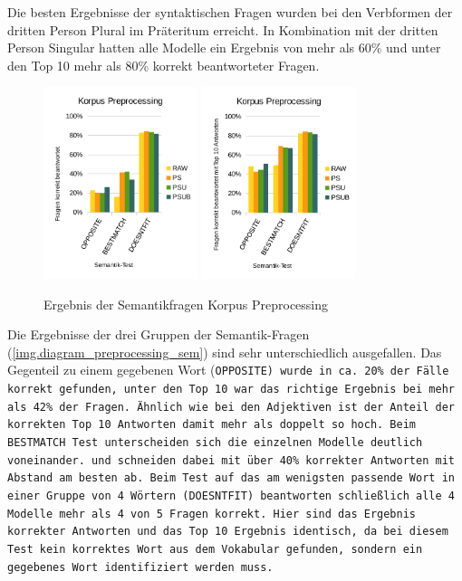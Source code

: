 Die besten Ergebnisse der syntaktischen Fragen wurden bei den Verbformen der dritten Person Plural im Präteritum erreicht. In Kombination mit der dritten Person Singular hatten alle Modelle ein Ergebnis von mehr als 60\% und unter den Top 10 mehr als 80\% korrekt beantworteter Fragen.

\begin{figure}[!ht]
\centering
{}
{\includegraphics[width=0.4\textwidth]{images/diagram_preprocessing_correct_sem}}
{\includegraphics[width=0.4\textwidth]{images/diagram_preprocessing_top10_sem}}
\caption[Ergebnis der Semantikfragen Korpus Preprocessing]{Ergebnis der Semantikfragen Korpus Preprocessing}\label{img.diagram_preprocessing_sem}
\end{figure}

Die Ergebnisse der drei Gruppen der Semantik-Fragen (\autoref{img.diagram_preprocessing_sem}) sind sehr unterschiedlich ausgefallen. Das Gegenteil zu einem gegebenen Wort (\tt{OPPOSITE}) wurde in ca. 20\% der Fälle korrekt gefunden, unter den Top 10 war das richtige Ergebnis bei mehr als 42\% der Fragen. Ähnlich wie bei den Adjektiven ist der Anteil der korrekten Top 10 Antworten damit mehr als doppelt so hoch.
Beim \tt{BESTMATCH} Test unterscheiden sich die einzelnen Modelle deutlich voneinander.  und  schneiden dabei mit über 40\% korrekter Antworten mit Abstand am besten ab.
Beim Test auf das am wenigsten passende Wort in einer Gruppe von 4 Wörtern (\tt{DOESNTFIT}) beantworten schließlich alle 4 Modelle mehr als 4 von 5 Fragen korrekt. Hier sind das Ergebnis korrekter Antworten und das Top 10 Ergebnis identisch, da bei diesem Test kein korrektes Wort aus dem Vokabular gefunden, sondern ein gegebenes Wort identifiziert werden muss.

